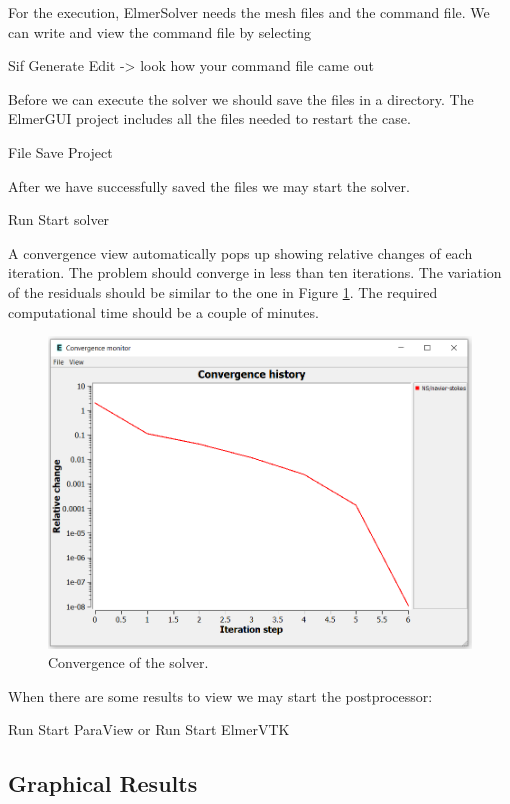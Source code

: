 For the execution, ElmerSolver needs the mesh files and the command file.  We can write and view the command file by selecting

\ttbegin
Sif 
  Generate
  Edit -> look how your command file came out  
\ttend

Before we can execute the solver we should save the files in a directory.  The ElmerGUI project includes all the files needed to restart the case.

\ttbegin
File 
  Save Project
\ttend

After we have successfully saved the files we may start the solver.

\ttbegin
Run
  Start solver
\ttend

A convergence view automatically pops up showing relative changes of each iteration. The problem should converge in less than ten iterations.
The variation of the residuals should be similar to the one in Figure \ref{fg:DC_convergence}. The required computational time should be a couple of minutes.

\begin{figure}[H]
\centering
\includegraphics[scale=0.5]{DC_convergence}
\caption{Convergence of the solver.}\label{fg:DC_convergence}
\end{figure} 

When there are some results to view we may start the postprocessor:

\ttbegin
Run
  Start ParaView
\ttend
or
\ttbegin
Run
  Start ElmerVTK
\ttend

\subsection*{Graphical Results}

